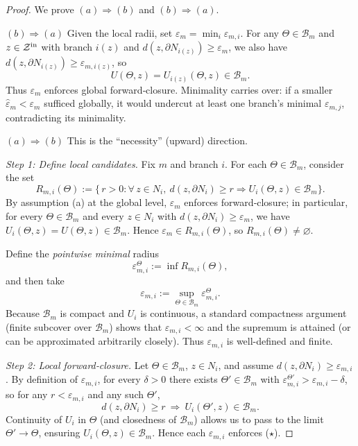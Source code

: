 \documentclass[12pt]{article}
\theoremstyle{definition}
\theoremstyle{plain}
\begin{document}
\begin{proof}
We prove \((a)\Rightarrow(b)\) and \((b)\Rightarrow(a)\).

\medskip
\noindent\(\boxed{(b)\Rightarrow(a)}\)  
Given the local radii, set \(\varepsilon_m=\min_i\varepsilon_{m,i}\).  
For any \(\Theta\in\mathcal B_m\) and \(z\in\mathcal Z^{\rm in}\) with branch \(i(z)\) and 
\(d(z,\partial N_{i(z)})\ge\varepsilon_m\), we also have \(d(z,\partial N_{i(z)})\ge\varepsilon_{m,i(z)}\), so
\[
  U(\Theta,z)=U_{i(z)}(\Theta,z)\in\mathcal B_m.
\]
Thus \(\varepsilon_m\) enforces global forward‑closure.  
Minimality carries over: if a smaller \(\widehat\varepsilon_m<\varepsilon_m\) sufficed globally, it would undercut at least one branch’s minimal \(\varepsilon_{m,j}\), contradicting its minimality.

\medskip
\noindent\(\boxed{(a)\Rightarrow(b)}\)  
This is the “necessity” (upward) direction.

\smallskip
\emph{Step 1: Define local candidates.}  
Fix \(m\) and branch \(i\).  
For each \(\Theta\in\mathcal B_m\), consider the set
\[
  R_{m,i}(\Theta)
  := \bigl\{\,r>0 : \forall\,z\in N_i,\ d(z,\partial N_i)\ge r \Rightarrow 
      U_i(\Theta,z)\in\mathcal B_m \bigr\}.
\]
By assumption (a) at the global level, \(\varepsilon_m\) enforces forward‑closure; in particular, for every \(\Theta\in\mathcal B_m\) and every \(z\in N_i\) with \(d(z,\partial N_i)\ge\varepsilon_m\), we have \(U_i(\Theta,z)=U(\Theta,z)\in\mathcal B_m\).  
Hence \(\varepsilon_m\in R_{m,i}(\Theta)\), so \(R_{m,i}(\Theta)\neq\varnothing\).

Define the \emph{pointwise minimal} radius
\[
  \varepsilon_{m,i}^\Theta := \inf R_{m,i}(\Theta),
\]
and then take
\[
  \varepsilon_{m,i} := \sup_{\Theta\in\mathcal B_m}\varepsilon_{m,i}^\Theta.
\]
Because \(\mathcal B_m\) is compact and \(U_i\) is continuous, a standard compactness argument (finite subcover over \(\mathcal B_m\)) shows that \(\varepsilon_{m,i}<\infty\) and the supremum is attained (or can be approximated arbitrarily closely).  Thus \(\varepsilon_{m,i}\) is well-defined and finite.

\smallskip
\emph{Step 2: Local forward‑closure.}  
Let \(\Theta\in\mathcal B_m\), \(z\in N_i\), and assume \(d(z,\partial N_i)\ge\varepsilon_{m,i}\).  
By definition of \(\varepsilon_{m,i}\), for every \(\delta>0\) there exists \(\Theta'\in\mathcal B_m\) with \(\varepsilon_{m,i}^{\Theta'}>\varepsilon_{m,i}-\delta\), so for any \(r<\varepsilon_{m,i}\) and any such \(\Theta'\),
\[
  d(z,\partial N_i)\ge r \ \Longrightarrow\ U_i(\Theta',z)\in\mathcal B_m.
\]
Continuity of \(U_i\) in \(\Theta\) (and closedness of \(\mathcal B_m\)) allows us to pass to the limit \(\Theta'\to\Theta\), ensuring
\(U_i(\Theta,z)\in\mathcal B_m\).  
Hence each \(\varepsilon_{m,i}\) enforces (\(\star\)).


\end{proof}
\end{document}
